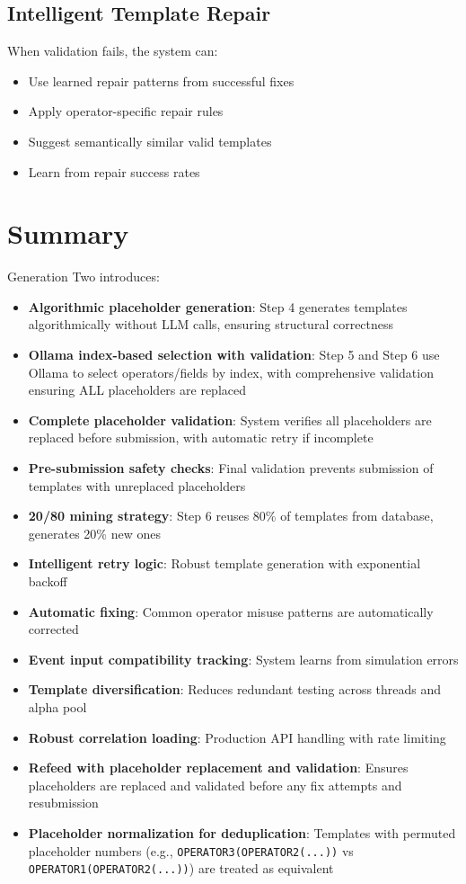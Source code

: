 \subsection{Intelligent Template Repair}

When validation fails, the system can:
\begin{itemize}
    \item Use learned repair patterns from successful fixes
    \item Apply operator-specific repair rules
    \item Suggest semantically similar valid templates
    \item Learn from repair success rates
\end{itemize}

\section{Summary}

Generation Two introduces:
\begin{itemize}
    \item \textbf{Algorithmic placeholder generation}: Step 4 generates templates algorithmically without LLM calls, ensuring structural correctness
    \item \textbf{Ollama index-based selection with validation}: Step 5 and Step 6 use Ollama to select operators/fields by index, with comprehensive validation ensuring ALL placeholders are replaced
    \item \textbf{Complete placeholder validation}: System verifies all placeholders are replaced before submission, with automatic retry if incomplete
    \item \textbf{Pre-submission safety checks}: Final validation prevents submission of templates with unreplaced placeholders
    \item \textbf{20/80 mining strategy}: Step 6 reuses 80\% of templates from database, generates 20\% new ones
    \item \textbf{Intelligent retry logic}: Robust template generation with exponential backoff
    \item \textbf{Automatic fixing}: Common operator misuse patterns are automatically corrected
    \item \textbf{Event input compatibility tracking}: System learns from simulation errors
    \item \textbf{Template diversification}: Reduces redundant testing across threads and alpha pool
    \item \textbf{Robust correlation loading}: Production API handling with rate limiting
    \item \textbf{Refeed with placeholder replacement and validation}: Ensures placeholders are replaced and validated before any fix attempts and resubmission
    \item \textbf{Placeholder normalization for deduplication}: Templates with permuted placeholder numbers (e.g., \texttt{OPERATOR3(OPERATOR2(...))} vs \texttt{OPERATOR1(OPERATOR2(...))}) are treated as equivalent
\end{itemize}

